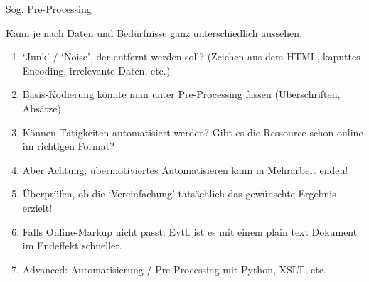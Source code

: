 \begin{frame}[allowframebreaks]{Sog. Pre-Processing}

 Kann je nach Daten und Bedürfnisse ganz unterschiedlich aussehen. \\
 
\begin{enumerate}
    \item `Junk' / `Noise', der entfernt werden soll? (Zeichen aus dem HTML, kaputtes Encoding, irrelevante Daten, etc.)
    \item Basis-Kodierung könnte man unter Pre-Processing fassen (Überschriften, Absätze)
    \item Können Tätigkeiten automatisiert werden? Gibt es die Ressource schon online im richtigen Format?
    \item Aber Achtung, übermotiviertes Automatisieren kann in Mehrarbeit enden!
    \item Überprüfen, ob die `Vereinfachung' tatsächlich das gewünschte Ergebnis erzielt!
    \item Falls Online-Markup nicht passt: Evtl. ist es mit einem plain text Dokument im Endeffekt schneller. 
    \item Advanced: Automatisierung / Pre-Processing mit Python, XSLT, etc.
\end{enumerate}

\end{frame}

